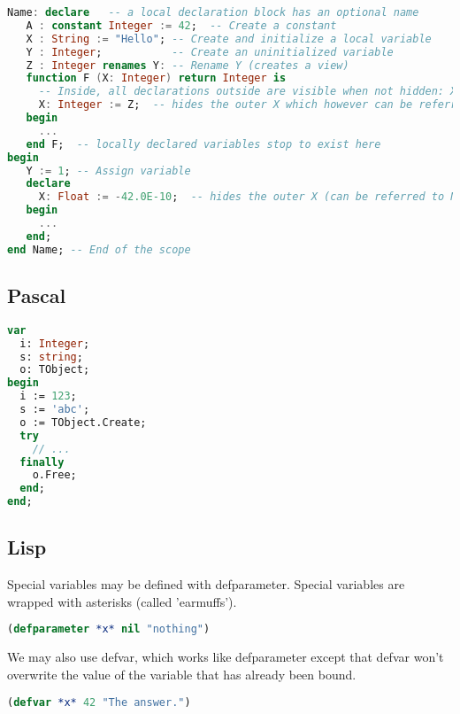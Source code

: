 \documentclass[12pt]{book}
\begin{document}
\lstset{style=mystyle}
\begin{lstlisting}[language=Ada, caption=Ada example]
Name: declare   -- a local declaration block has an optional name
   A : constant Integer := 42;  -- Create a constant
   X : String := "Hello"; -- Create and initialize a local variable
   Y : Integer;           -- Create an uninitialized variable
   Z : Integer renames Y: -- Rename Y (creates a view)
   function F (X: Integer) return Integer is
     -- Inside, all declarations outside are visible when not hidden: X, Y, Z are global with respect to F.
     X: Integer := Z;  -- hides the outer X which however can be referred to by Name.X
   begin
     ...
   end F;  -- locally declared variables stop to exist here
begin
   Y := 1; -- Assign variable
   declare
     X: Float := -42.0E-10;  -- hides the outer X (can be referred to Name.X like in F)
   begin
     ...
   end;
end Name; -- End of the scope
\end{lstlisting}



\newpage

\subsection{Pascal}

\lstset{style=mystyle}
\begin{lstlisting}[language=Pascal, caption=Pascal example]
var
  i: Integer;
  s: string;
  o: TObject;
begin
  i := 123;
  s := 'abc';
  o := TObject.Create;
  try
    // ...
  finally
    o.Free;
  end;
end;
\end{lstlisting}

\subsection{Lisp}

Special variables may be defined with defparameter.
Special variables are wrapped with asterisks (called 'earmuffs').

\lstset{style=mystyle}
\begin{lstlisting}[language=Lisp, caption=Lisp example]
(defparameter *x* nil "nothing")
\end{lstlisting}

We may also use defvar, which works like defparameter except that defvar won't overwrite the value of the variable that has already been bound.

\lstset{style=mystyle}
\begin{lstlisting}[language=Lisp, caption=Lisp example]
(defvar *x* 42 "The answer.")
\end{lstlisting}
\end{document}
